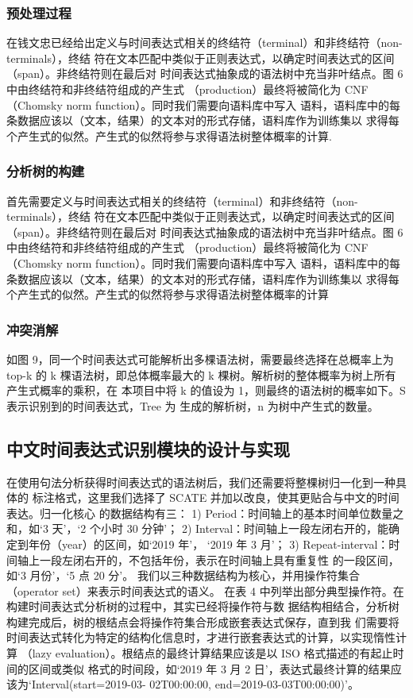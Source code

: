 \subsubsection{预处理过程}

在钱文忠已经给出定义与时间表达式相关的终结符（terminal）和非终结符（non-terminals），终结
符在文本匹配中类似于正则表达式，以确定时间表达式的区间（span）。非终结符则在最后对
时间表达式抽象成的语法树中充当非叶结点。图 6 中由终结符和非终结符组成的产生式
（production）最终将被简化为 CNF（Chomsky norm function）。同时我们需要向语料库中写入
语料，语料库中的每条数据应该以（文本，结果）的文本对的形式存储，语料库作为训练集以
求得每个产生式的似然。产生式的似然将参与求得语法树整体概率的计算.

\subsubsection{分析树的构建}

首先需要定义与时间表达式相关的终结符（terminal）和非终结符（non-terminals），终结
符在文本匹配中类似于正则表达式，以确定时间表达式的区间（span）。非终结符则在最后对
时间表达式抽象成的语法树中充当非叶结点。图 6 中由终结符和非终结符组成的产生式
（production）最终将被简化为 CNF（Chomsky norm function）。同时我们需要向语料库中写入
语料，语料库中的每条数据应该以（文本，结果）的文本对的形式存储，语料库作为训练集以
求得每个产生式的似然。产生式的似然将参与求得语法树整体概率的计算

\subsubsection{冲突消解}

如图 9，同一个时间表达式可能解析出多棵语法树，需要最终选择在总概率上为 top-k 的
k 棵语法树，即总体概率最大的 k 棵树。解析树的整体概率为树上所有产生式概率的乘积，在
本项目中将 k 的值设为 1，则最终的语法树的概率如下。S 表示识别到的时间表达式，Tree 为
生成的解析树，n 为树中产生式的数量。


\subsection{中文时间表达式识别模块的设计与实现}

在使用句法分析获得时间表达式的语法树后，我们还需要将整棵树归一化到一种具体的
标注格式，这里我们选择了 SCATE 并加以改良，使其更贴合与中文的时间表达。归一化核心
的数据结构有三：
1) Period：时间轴上的基本时间单位数量之和，如‘3 天’，‘2 个小时 30 分钟’；
2) Interval：时间轴上一段左闭右开的，能确定到年份（year）的区间，如‘2019 年’，
‘2019 年 3 月’；
3) Repeat-interval：时间轴上一段左闭右开的，不包括年份，表示在时间轴上具有重复性
的一段区间，如‘3 月份’，‘5 点 20 分’。
我们以三种数据结构为核心，并用操作符集合（operator set）来表示时间表达式的语义。
在表 4 中列举出部分典型操作符。在构建时间表达式分析树的过程中，其实已经将操作符与数
据结构相结合，分析树构建完成后，树的根结点会将操作符集合形成嵌套表达式保存，直到我
们需要将时间表达式转化为特定的结构化信息时，才进行嵌套表达式的计算，以实现惰性计算
（lazy evaluation）。根结点的最终计算结果应该是以 ISO 格式描述的有起止时间的区间或类似
格式的时间段，如‘2019 年 3 月 2 日’，表达式最终计算的结果应该为‘Interval(start=2019-03-
02T00:00:00, end=2019-03-03T00:00:00)’。


